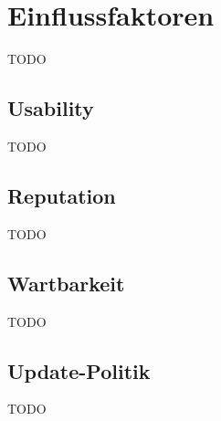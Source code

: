 \documentclass[Bachelorarbeit.tex]{subfiles}
\begin{document}
\chapter{Einflussfaktoren}
TODO

\section{Usability}
TODO

\section{Reputation}
TODO

\section{Wartbarkeit}
TODO

\section{Update-Politik}
TODO
\end{document}
